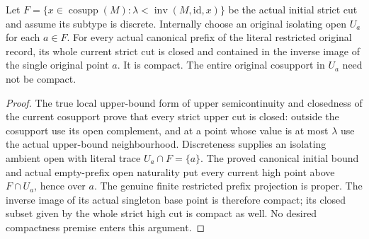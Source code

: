 \begin{lemma}
\label{hir:original-discrete-full-cut-compact-current-high-locus}
\leanok
Let $F=\{x\in\operatorname{cosupp}(M):\lambda<\operatorname{inv}(M,\mathrm{id},x)\}$
be the actual initial strict cut and assume its subtype is discrete.
Internally choose an original isolating open $U_a$ for each $a\in F$.
For every actual canonical prefix of the literal restricted original record,
its whole current strict cut is closed and contained in the inverse image
of the single original point $a$. It is compact. The entire original
cosupport in $U_a$ need not be compact.
\end{lemma}
\begin{proof}
The true local upper-bound form of upper semicontinuity and closedness of
the current cosupport prove that every strict upper cut is closed: outside
the cosupport use its open complement, and at a point whose value is at most
$\lambda$ use the actual upper-bound neighbourhood. Discreteness supplies
an isolating ambient open with literal trace $U_a\cap F=\{a\}$.
The proved canonical initial bound and actual empty-prefix open naturality
put every current high point above $F\cap U_a$, hence over $a$.
The genuine finite restricted prefix projection is proper. The inverse
image of its actual singleton base point is therefore compact; its closed
subset given by the whole strict high cut is compact as well. No desired
compactness premise enters this argument.
\end{proof}

